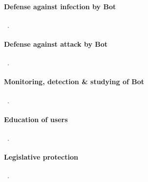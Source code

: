


\paragraph{Defense against infection by Bot}
~\cite{stankovic2009defense}.



\paragraph{Defense against attack by Bot}
~\cite{stankovic2009defense}.



\paragraph{Monitoring, detection & studying of Bot}
~\cite{stankovic2009defense}.


\paragraph{Education of users}
~\cite{stankovic2009defense}.


\paragraph{Legislative protection}
~\cite{stankovic2009defense}.